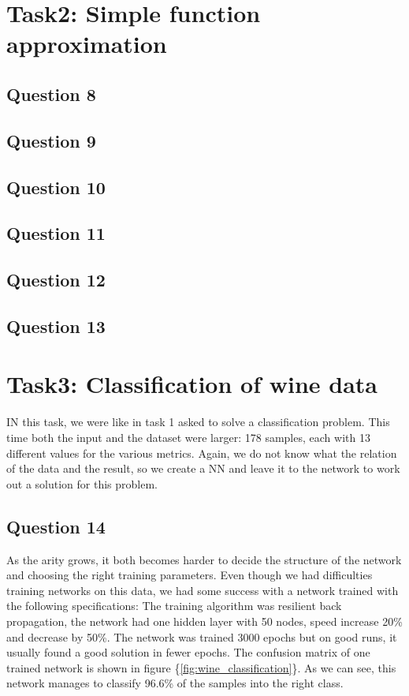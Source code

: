 \documentclass[a4paper]{article}
\begin{document}
\section{Task2: Simple function approximation}

\subsection*{Question 8}
\subsection*{Question 9}
\subsection*{Question 10}
\subsection*{Question 11}
\subsection*{Question 12}
\subsection*{Question 13}

\section{Task3: Classification of wine data}
IN this task, we were like in task 1 asked to solve a classification problem. This time 
both the input and the dataset were larger: 178 samples, each with 13 different values for 
the various metrics. Again, we do not know what the relation of the data and the result, 
so we create a NN and leave it to the network to work out a solution for this problem.

\subsection*{Question 14}
As the arity grows, it both becomes harder to decide the structure of the network and 
choosing the right training parameters. Even though we had difficulties training networks 
on this data, we had some success with a 
network trained with the following specifications: The training algorithm was 
resilient back propagation, the network had one hidden layer with 50 
nodes, speed increase 20\% and decrease by 50\%. The network was trained 3000 epochs but 
on good runs, it usually found a good solution in fewer epochs. The confusion matrix 
of one trained network is shown in figure \{\ref{fig:wine_classification}\}. 
As we can see, this network manages to classify 96.6\% of the samples into the right class.
\end{document}
